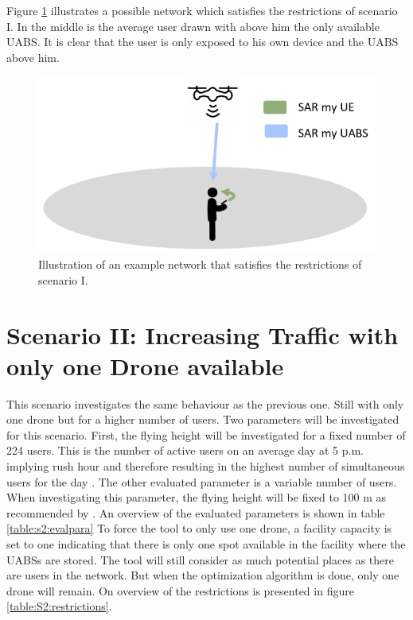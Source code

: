 Figure \ref{fig:IllustrationS1} illustrates a possible network which satisfies the restrictions of scenario I. In the middle is the average user drawn with above him the only available \gls{UABS}.
It is clear that the user is only exposed to his own device and the \gls{UABS} above him.
\begin{figure}[H]
\centering
  \includegraphics[width=\textwidth/3*2]{../images/IllustrationS1.png}
  \caption{Illustration of an example network that satisfies the restrictions of scenario I.}
  \label{fig:IllustrationS1}
\end{figure}



\FloatBarrier
\section{Scenario II: Increasing Traffic with only one Drone available}

This scenario investigates the same behaviour as the previous one. Still with only one drone but for a higher number of users. 
Two parameters will be investigated for this scenario. First, the
flying height will be investigated for a fixed number of 224 users. 
This is the number of active users on an average day at 5 p.m. implying rush hour and therefore 
resulting in the highest number of simultaneous users for the day \cite{J2}. The other 
evaluated parameter is a variable number of users. When investigating this 
parameter, the flying height will be fixed to 100 m as recommended by \cite{J2}.
An overview of the evaluated parameters is shown in table \ref{table:s2:evalpara}
 To force the tool to only use one drone, a facility capacity is set to one 
indicating that there is only one spot available in the facility where the \gls{UABS}s are stored. The tool will still consider as much potential places 
as there are users in the network. But when the optimization algorithm is done, only one drone will remain.
On overview of the restrictions is presented in figure \ref{table:S2:restrictions}.

